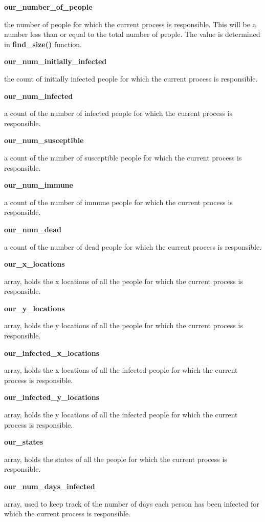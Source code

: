 \documentclass[letterpaper,10pt,openany,oneside]{sphinxmanual}
\begin{document}
\textbf{our\_number\_of\_people}

the number of people for which the current process is responsible. This will be a number less than or equal to the total number of people. The value is determined in \textbf{find\_size()} function.

\textbf{our\_num\_initially\_infected}

the count of initially infected people for which the current process is responsible.

\textbf{our\_num\_infected}

a count of the number of infected people for which the current process is responsible.

\textbf{our\_num\_susceptible}

a count of the number of susceptible people for which the current process is responsible.

\textbf{our\_num\_immune}

a count of the number of immune people for which the current process is responsible.

\textbf{our\_num\_dead}

a count of the number of dead people for which the current process is responsible.

\textbf{our\_x\_locations}

array, holds the x locations of all the people for which the current process is responsible.

\textbf{our\_y\_locations}

array, holds the y locations of all the people for which the current process is responsible.

\textbf{our\_infected\_x\_locations}

array, holds the x locations of all the infected people for which the current process is responsible.

\textbf{our\_infected\_y\_locations}

array, holds the y locations of all the infected people for which the current process is responsible.

\textbf{our\_states}

array, holds the states of all the people for which the current process is responsible.

\textbf{our\_num\_days\_infected}

array, used to keep track of the number of days each person has been infected for which the current process is responsible.
\end{document}
